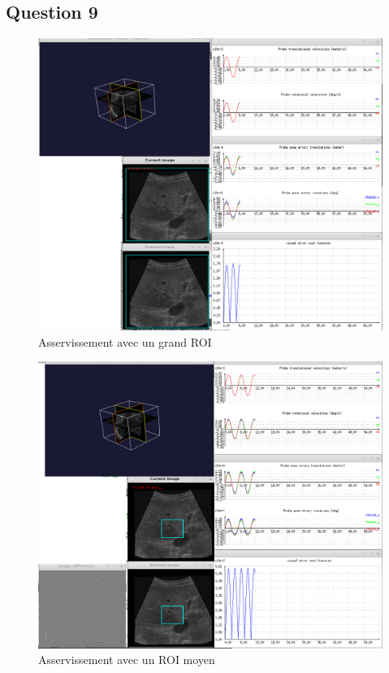 \documentclass[a4paper,11pt]{article}
\begin{document}
\subsection{Question 9}
\begin{figure}[H]
    \centering
    \includegraphics[width=1.0\textwidth]{./images/q9_large.png}
    \caption{Asservissement avec un grand ROI}
    \label{largeRoi}
\end{figure}

\begin{figure}[H]
    \centering
    \includegraphics[width=1.0\textwidth]{./images/q9_medium.png}
    \caption{Asservissement avec un ROI moyen}
    \label{mediumRoi}
\end{figure}
\end{document}

